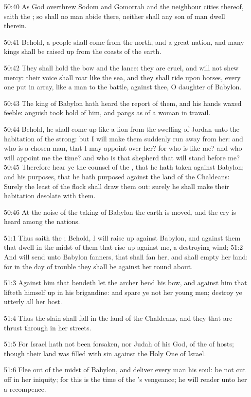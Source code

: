 50:40 As God overthrew Sodom and Gomorrah and the neighbour cities thereof, saith the \LORD; so shall no man abide there, neither shall any son of man dwell therein.

50:41 Behold, a people shall come from the north, and a great nation, and many kings shall be raised up from the coasts of the earth.

50:42 They shall hold the bow and the lance: they are cruel, and will not shew mercy: their voice shall roar like the sea, and they shall ride upon horses, every one put in array, like a man to the battle, against thee, O daughter of Babylon.

50:43 The king of Babylon hath heard the report of them, and his hands waxed feeble: anguish took hold of him, and pangs as of a woman in travail.

50:44 Behold, he shall come up like a lion from the swelling of Jordan unto the habitation of the strong: but I will make them suddenly run away from her: and who is a chosen man, that I may appoint over her?  for who is like me? and who will appoint me the time? and who is that shepherd that will stand before me?  50:45 Therefore hear ye the counsel of the \LORD, that he hath taken against Babylon; and his purposes, that he hath purposed against the land of the Chaldeans: Surely the least of the flock shall draw them out: surely he shall make their habitation desolate with them.

50:46 At the noise of the taking of Babylon the earth is moved, and the cry is heard among the nations.

51:1 Thus saith the \LORD; Behold, I will raise up against Babylon, and against them that dwell in the midst of them that rise up against me, a destroying wind; 51:2 And will send unto Babylon fanners, that shall fan her, and shall empty her land: for in the day of trouble they shall be against her round about.

51:3 Against him that bendeth let the archer bend his bow, and against him that lifteth himself up in his brigandine: and spare ye not her young men; destroy ye utterly all her host.

51:4 Thus the slain shall fall in the land of the Chaldeans, and they that are thrust through in her streets.

51:5 For Israel hath not been forsaken, nor Judah of his God, of the \LORD of hosts; though their land was filled with sin against the Holy One of Israel.

51:6 Flee out of the midst of Babylon, and deliver every man his soul: be not cut off in her iniquity; for this is the time of the \LORD's vengeance; he will render unto her a recompence.

